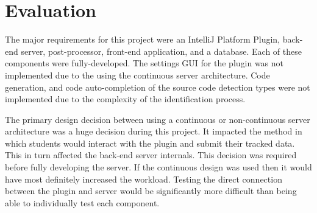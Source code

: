 \chapter{Evaluation}






The major requirements for this project were an IntelliJ Platform Plugin, back-end server, post-processor, front-end application, and a database. Each of these components were fully-developed. The settings GUI for the plugin was not implemented due to the using the continuous server architecture. Code generation, and code auto-completion of the source code detection types were not implemented due to the complexity of the identification process.

The primary design decision between using a continuous or non-continuous server architecture was a huge decision during this project. It impacted the method in which students would interact with the plugin and submit their tracked data. This in turn affected the back-end server internals. This decision was required before fully developing the server. If the continuous design was used then it would have most definitely increased the workload. Testing the direct connection between the plugin and server would be significantly more difficult than being able to individually test each component.

